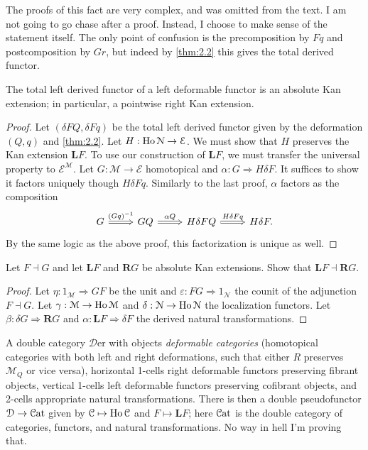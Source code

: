 The proofs of this fact are very complex, and was omitted from the text. I am not going to go chase after a proof. Instead, I choose to make sense of the statement itself. The only point of confusion is the precomposition by $Fq$ and postcomposition by $Gr$, but indeed by \cref{thm:2.2} this gives the total derived functor.

\begin{proposition}\label{prp:2.1}
	The total left derived functor of a left deformable functor is an absolute Kan extension; in particular, a pointwise right Kan extension.
\end{proposition}
\begin{proof}
	Let $(\delta FQ,\delta Fq)$ be the total left derived functor given by the deformation $(Q,q)$ and \cref{thm:2.2}. Let $H : \operatorname{Ho} \mathcal{N}  \to \mathcal{E} $. We must show that $H$ preserves the Kan extension $\mathbf{L} F$. To use our construction of $\mathbf{L} F$, we must transfer the universal property to $\mathcal{E} ^{\mathcal{M} } $. Let $G : \mathcal{M}  \to \mathcal{E} $ homotopical and $\alpha : G \Rightarrow H\delta F$. It suffices to show it factors uniquely though $H\delta Fq$. Similarly to the last proof, $\alpha$ factors as the composition
	\[\begin{tikzcd}[row sep = 2.5em, column sep = 2.5em]
		G\ar[" (Gq)^{-1}  ", Rightarrow, r]  & GQ \ar[" \alpha Q ", Rightarrow, r]  & H\delta FQ \ar[" H\delta Fq ", Rightarrow, r] & H\delta F.
	\end{tikzcd}\]
	By the same logic as the above proof, this factorization is unique as well.
\end{proof}

\begin{exercise}
	Let $F\dashv G$ and let $\mathbf{L} F$ and $\mathbf{R} G$ be absolute Kan extensions. Show that $\mathbf{L} F\dashv \mathbf{R} G$.
\end{exercise}
\begin{proof}
	Let $\eta : 1_\mathcal{M}  \Rightarrow GF$ be the unit and $\varepsilon : FG \Rightarrow 1_\mathcal{N} $ the counit of the adjunction $F\dashv G$. Let $\gamma : \mathcal{M}  \to \operatorname{Ho} \mathcal{M} $ and $\delta : \mathcal{N}  \to \operatorname{Ho}\mathcal{N} $ the localization functors. Let $\beta : \delta G \Rightarrow \mathbf{R} G$ and $\alpha : \mathbf{L} F \Rightarrow \delta F$ the derived natural transformations. 
\end{proof}

A double category $\mathcal{D} \mathrm{er} $ with objects \emph{deformable categories} (homotopical categories with both left and right deformations, such that either $R$ preserves $\mathcal{M} _Q$ or vice versa), horizontal 1-cells right deformable functors preserving fibrant objects, vertical 1-cells left deformable functors preserving cofibrant objects, and 2-cells appropriate natural transformations. There is then a double pseudofunctor $\mathcal{D} \to \mathcal{C}\mathrm{at} $ given by $\mathcal{C} \mapsto \operatorname{Ho} \mathcal{C} $ and $F\mapsto \mathbf{L} F$; here $\mathcal{C}\mathrm{at} $ is the double category of categories, functors, and natural transformations. No way in hell I'm proving that.

